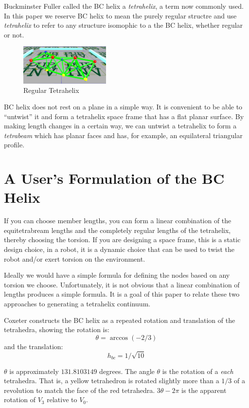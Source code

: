 \documentclass[11pt]{article}
\begin{document}
Buckminster Fuller called the BC helix a \emph{tetrahelix}\cite{fuller1982synergetics},
a term now commonly used. In this paper we reserve BC helix to mean the purely regular structre and use \emph{tetrahelix} to refer
to any structure isomophic to a the BC helix, whether regular or not.

\begin{figure}[H] %
  \centering
     \includegraphics[width=0.4\textwidth]{figures/Tetrahelix0.png}
     \caption{Regular Tetrahelix}
\end{figure}

BC helix does not rest on a plane in a simple way. It is convenient to be able to ``untwist'' it and form a tetrahelix space frame that
has a flat planar surface. By making length changes in a certain way, we can untwist a tetrahelix to form a \emph{tetrabeam} which
has planar faces and has, for example, an equilateral triangular profile.

\section{A User's Formulation of the BC Helix}

If you can choose member lengths, you can form a linear combination of the equitetrabream lengths and the completely regular
lengths of the tetrahelix, thereby choosing the torsion.  If you are designing a space frame, this is a static design choice,
in a robot, it is a dynamic choice that can be used to twist the robot and/or exert torsion on the environment.

Ideally we would have a simple formula for defining the nodes based on any torsion we choose.
Unfortunately, it is not obvious that a linear combination of lengths produces a simple formula.
It is a goal of this paper to relate these two approaches to generating a tetrahelix continuum.

Coxeter constructs the BC helix\cite{coxeter1985simplicial} as a repeated rotation and translation of the tetrahedra, showing the
rotation is:
\[
\theta = \arccos(-2/3) 
\]
and the translation:
\[
h_{bc} = 1/\sqrt{10}
\]


$\theta$ is approximately $131.8103149$ degrees.
The angle $\theta$ is the rotation of a \emph{each} tetrahedra.
That is, a yellow tetrahedron is rotated slightly more than a $1/3$ of a revolution to match the face of the red tetrahedra.
$3 \theta - 2\pi$ is the apparent rotation of $V_3$ relative to $V_0$.
\end{document}

